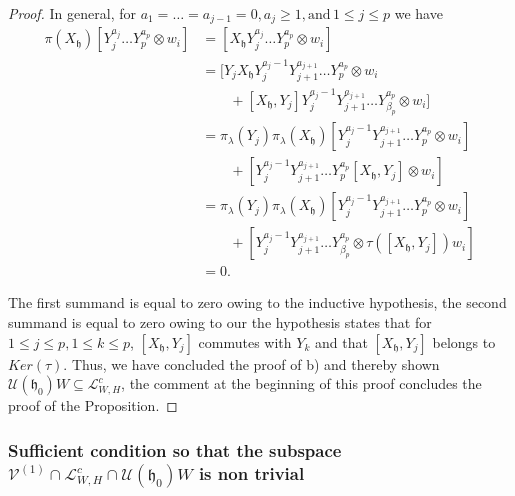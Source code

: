 \documentclass[12pt]{amsart}
\theoremstyle{definition}
\theoremstyle{remark}
\newcommand{\h}{\mathfrak{h}}
\numberwithin{equation}{section}
\begin{document}
\begin{proof}
In general, for $ a_1= \dots =a_{j-1}=0, a_j \geq 1,
\text{and}\, 1\leq  j\leq p$ we have
\begin{equation*} \begin{split} \pi (X_{\h})[Y_{j}^{a_j}
\dots Y_{p}^{a_p} \otimes w_i] & = [X_{\h}Y_{j}^{a_j}\dots Y_{p}^{a_p} \otimes w_i]  \\ & =[Y_{j}X_{\h}Y_{j}^{a_j -1}Y_{j+1}^{a_{j+1}}
\dots Y_{p}^{a_p} \otimes w_i \\ & \quad \quad  + [X_{\h}, Y_{j}] Y_{j}^{a_j -1}Y_{j+1}^{a_{j+1}}
\dots Y_{\beta_p}^{a_p} \otimes w_i] \\   & =  \pi_\lambda (Y_{j})\pi_\lambda(X_{\h})
[Y_{j}^{a_j -1} Y_{j+1}^{a_{j+1}} \dots Y_{p}^{a_p} \otimes w_i]   \\ &  \quad \quad + [  Y_{j}^{a_j -1}Y_{j+1}^{a_{j+1}}
  \dots Y_{p}^{a_p} [X_{\h}, Y_{j}] \otimes w_i]\\   & =  \pi_\lambda (Y_{j})\pi_\lambda(X_{\h})
[Y_{j}^{a_j -1} Y_{j+1}^{a_{j+1}} \dots Y_{p}^{a_p} \otimes w_i]   \\ &   \quad \quad + [  Y_{j}^{a_j -1}Y_{j+1}^{a_{j+1}}
\dots Y_{\beta_p}^{a_p} \otimes \tau([X_\h,Y_j])w_i]  \\ & =0. \end{split}
\end{equation*}

The first summand is equal to zero owing to the inductive hypothesis,
the second summand is equal to zero owing to our  the hypothesis
states that for $1\leq j \leq p, 1 \leq k \leq p$, $[X_{\h}, Y_{j}]$ commutes with
$Y_{k}$   and
that $[X_{\h}, Y_{j}]$ belongs to $Ker(\tau).$
Thus, we have concluded the proof of b) and thereby shown
$\mathcal U(\h_0)W \subseteq \mathcal L_{W,H}^c$, the comment at the beginning of
this proof concludes the proof of the Proposition. \end{proof}

\subsubsection{Sufficient condition so that the subspace $\mathcal V^{(1)}\cap \mathcal L_{W,H}^c \cap \mathcal U(\h_0)W$ is non trivial}
\end{document}

